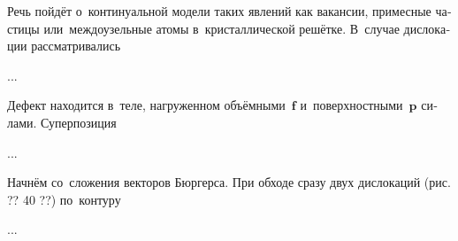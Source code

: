 \label{para:pointdefects}

\begin{otherlanguage}{russian}

Речь пойдёт о~континуальной модели таких явлений как вакансии, примесные частицы или~междоузельные атомы в~кристаллической решётке. В~случае дислокации рассматривались

...



\end{otherlanguage}



\label{para:forceonpointdefect}

\begin{otherlanguage}{russian}

Дефект находится в~теле, нагруженном объёмными~$\bm{f}$ и~поверхностными~$\bm{p}$ силами. Суперпозиция

...



\end{otherlanguage}



\label{para:dislocations.continuouslydistributed}

\begin{otherlanguage}{russian}

Начнём со~сложения векторов Бюргерса. При обходе сразу двух дислокаций (рис. ?? 40 ??) по~контуру

...




\end{otherlanguage}

